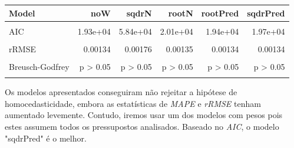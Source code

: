 \documentclass[justified, 11pt]{scrartcl}\usepackage[]{graphicx}\usepackage[]{xcolor}
\newenvironment{knitrout}{}{} %
\begin{document}
\begin{knitrout}
\begin{table}
\begin{tabular}{l|r|r|r|r|r}
\hline
Model & noW & sqdrN & rootN & rootPred & sqdrPred\\
\hline
\cellcolor{gray!6}{R2} & \cellcolor{gray!6}{0.4} & \cellcolor{gray!6}{0.881} & \cellcolor{gray!6}{0.352} & \cellcolor{gray!6}{0.408} & \cellcolor{gray!6}{0.431}\\
\hline
AIC & 1.93e+04 & 5.84e+04 & 2.01e+04 & 1.94e+04 & 1.97e+04\\
\hline
\cellcolor{gray!6}{MAPE} & \cellcolor{gray!6}{0.0869} & \cellcolor{gray!6}{0.128} & \cellcolor{gray!6}{0.0884} & \cellcolor{gray!6}{0.0869} & \cellcolor{gray!6}{0.0875}\\
\hline
rRMSE & 0.00134 & 0.00176 & 0.00135 & 0.00134 & 0.00134\\
\hline
\cellcolor{gray!6}{Breusch-Pagan} & \cellcolor{gray!6}{p = 2.46e-112} & \cellcolor{gray!6}{p > 0.05} & \cellcolor{gray!6}{p > 0.05} & \cellcolor{gray!6}{p = 4.8e-58} & \cellcolor{gray!6}{p > 0.05}\\
\hline
Breusch-Godfrey & p > 0.05 & p > 0.05 & p > 0.05 & p > 0.05 & p > 0.05\\
\hline
\cellcolor{gray!6}{Jarque-Bera} & \cellcolor{gray!6}{p < 0.05} & \cellcolor{gray!6}{p < 0.05} & \cellcolor{gray!6}{p < 0.05} & \cellcolor{gray!6}{p < 0.05} & \cellcolor{gray!6}{p < 0.05}\\
\hline
\end{tabular}
\endgroup{}
\end{table}

\end{knitrout}

Os modelos apresentados conseguiram não rejeitar a hipótese de homocedasticidade, embora as estatísticas de \textit{MAPE} e \textit{rRMSE} tenham aumentado levemente. Contudo, iremos usar um dos modelos com pesos pois estes assumem todos os pressupostos analisados. Baseado no \textit{AIC}, o modelo "sqdrPred" é o melhor.\\
\end{document}
